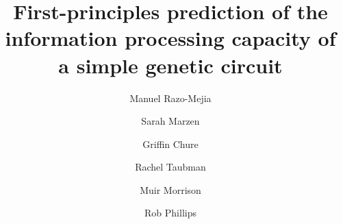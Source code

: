 \newcommand{\kpon}{k^{(p)}_{\text{on}}}
\newcommand{\kpoff}{k^{(p)}_{\text{off}}}
\newcommand{\kron}{k^{(r)}_{\text{on}}}
\newcommand{\kroff}{k^{(r)}_{\text{off}}}
\newcommand{\gm}{\gamma _m}
\newcommand{\gp}{\gamma _p}
\newcommand{\Km}{\bb{K}}
\newcommand{\Rm}{\bb{R}_m}
\newcommand{\Gm}{\bb{\Gamma}_m}
\newcommand{\Rp}{\bb{R}_p}
\newcommand{\Gp}{\bb{\Gamma}_p}
\newcommand{\PP}{\bb{P}}
\newcommand{\ee}[1]{\left\langle #1 \right\rangle}
\newcommand{\bb}[1]{\mathbf{#1}}
\newcommand{\dt}[1]{{d{#1} \over dt}}
\newcommand{\ddt}[1]{{\partial{#1} \over \partial t}}
\newcommand{\smp}{\sum_m \sum_p}
\newcommand{\bmu}{\boldsymbol{\mu}^{\bb{(x, y)}}}
\newcommand{\foldchange}{\text{fold-change}}
\newcommand{\Nns}{N_\text{NS}}
\newcommand{\eR}{\Delta\varepsilon_r}
\newcommand{\eP}{\Delta\varepsilon_p}
\newcommand{\eAI}{\Delta\varepsilon_{AI}}
\newcommand{\pbound}{p_{_\text{bound}}}
\let\oldth\th
\renewcommand{\th}{^\text{th}}


\title{\textbf{First-principles prediction of the information processing
capacity of a simple genetic circuit}}
\author[1]{Manuel Razo-Mejia}
\author[2]{Sarah Marzen}
\author[1]{Griffin Chure}
\author[2]{Rachel Taubman}
\author[3]{Muir Morrison}
\author[1, 3, *]{Rob Phillips}



\setcounter{Maxaffil}{0}
\renewcommand\Affilfont{\itshape\small}





